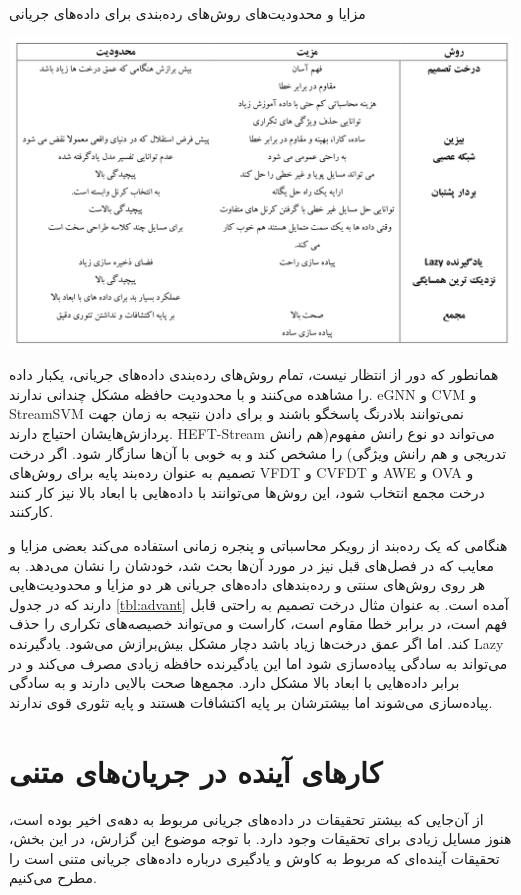 \begin{table}
  \caption{مزایا و محدودیت‌های روش‌های رده‌بندی برای داده‌های جریانی}
  \label{tbl:advant}
  \includegraphics[width=\linewidth]{advant}
\end{table}
همانطور که دور از انتظار نیست، تمام روش‌های رده‌بندی داده‌های جریانی، یکبار داده‌ را مشاهده می‌کنند و با محدودیت حافظه مشکل چندانی ندارند. eGNN و CVM و StreamSVM نمی‌توانند بلادرنگ پاسخگو باشند و برای دادن نتیجه به زمان جهت پردازش‌هایشان احتیاج دارند. HEFT-Stream می‌تواند دو نوع رانش‌ مفهوم(هم رانش تدریجی و هم رانش ویژگی) را مشخص کند و به خوبی با آن‌ها سازگار شود. اگر درخت تصمیم به عنوان رده‌بند پایه برای روش‌های VFDT و CVFDT و AWE و OVA و درخت مجمع انتخاب شود، این روش‌ها می‌توانند با داده‌هایی با ابعاد بالا نیز کار کنند کارکنند. 

هنگامی که یک رده‌بند از رویکر محاسباتی و پنجره زمانی استفاده می‌کند بعضی مزایا و معایب که در فصل‌های قبل نیز در مورد آن‌ها بحث شد، خودشان را نشان می‌دهد. به هر روی روش‌های سنتی و رده‌بندهای داده‌های جریانی هر دو مزایا و محدودیت‌هایی دارند که در جدول
\ref{tbl:advant}
آمده است. به عنوان مثال درخت تصمیم به راحتی قابل فهم است، در برابر خطا مقاوم است، کاراست و می‌تواند خصیصه‌های تکراری را حذف کند. اما اگر عمق درخت‌ها زیاد باشد دچار مشکل بیش‌برازش
می‌شود. یادگیرنده Lazy می‌تواند به سادگی پیاده‌سازی شود اما این یادگیرنده حافظه زیادی مصرف می‌کند و در برابر داده‌هایی با ابعاد بالا مشکل دارد. مجمع‌ها صحت بالایی دارند و به سادگی پیاده‌سازی می‌شوند اما بیشترشان بر پایه اکتشافات هستند و پایه تئوری قوی ندارند.


\section{کارهای آینده در جریان‌های متنی}
از آن‌جایی که بیشتر تحقیقات در داده‌های جریانی مربوط به دهه‌ی اخیر بوده است، هنوز مسایل زیادی برای تحقیقات وجود دارد. با توجه موضوع این گزارش، در این بخش، تحقیقات آینده‌ای که مربوط به کاوش و یادگیری درباره داده‌های جریانی متنی است را مطرح می‌کنیم.

